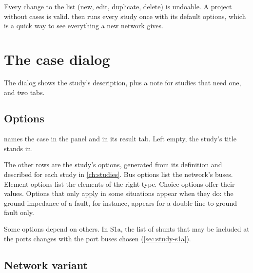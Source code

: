 Every change to the list (new, edit, duplicate, delete) is undoable. A project without
cases is valid.  then runs every study once with its default options, which is
a quick way to see everything a new network gives.

\section{The case dialog}

The dialog shows the study's description, plus a note for studies that need one, and two
tabs.

\subsection{Options}

\begin{minipage}[t]{0.5\linewidth}
 names the case in the panel and in its result tab. Left empty, the
study's title stands in.

The other rows are the study's options, generated from its definition and described for
each study in \cref{ch:studies}. Bus options list the network's buses. Element options
list the elements of the right type. Choice options offer their values. Options that only
apply in some situations appear when they do: the ground impedance of a fault, for
instance, appears for a double line-to-ground fault only.

Some options depend on others. In S1a, the list of shunts that may be included at the
ports changes with the port buses chosen (\cref{sec:study-s1a}).
\end{minipage}\hfill
\begin{minipage}[t]{0.45\linewidth}\vspace{0pt}
  \centering{}
\end{minipage}

\subsection{Network variant}\label{sec:variant}

